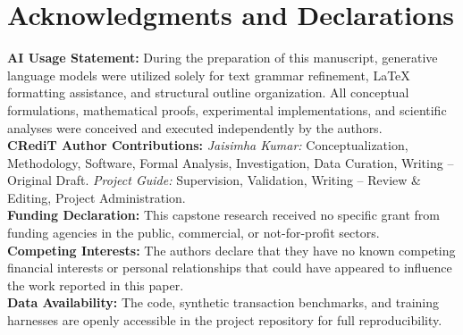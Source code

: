 \documentclass[10pt,twocolumn]{article}
\begin{document}
\section*{Acknowledgments and Declarations}
\small
\textbf{AI Usage Statement:} During the preparation of this manuscript, generative language models were utilized solely for text grammar refinement, LaTeX formatting assistance, and structural outline organization. All conceptual formulations, mathematical proofs, experimental implementations, and scientific analyses were conceived and executed independently by the authors. \\
\textbf{CRediT Author Contributions:} \textit{Jaisimha Kumar:} Conceptualization, Methodology, Software, Formal Analysis, Investigation, Data Curation, Writing – Original Draft. \textit{Project Guide:} Supervision, Validation, Writing – Review \& Editing, Project Administration. \\
\textbf{Funding Declaration:} This capstone research received no specific grant from funding agencies in the public, commercial, or not-for-profit sectors. \\
\textbf{Competing Interests:} The authors declare that they have no known competing financial interests or personal relationships that could have appeared to influence the work reported in this paper. \\
\textbf{Data Availability:} The code, synthetic transaction benchmarks, and training harnesses are openly accessible in the project repository for full reproducibility.
\end{document}
